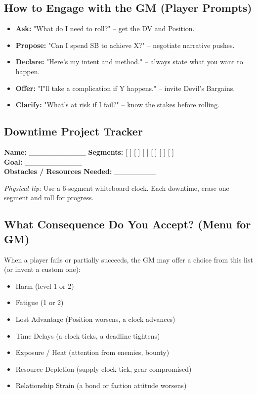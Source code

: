 \subsection{How to Engage with the GM (Player Prompts)}

\begin{itemize}
    \item \textbf{Ask:} "What do I need to roll?" -- get the DV and Position.
    \item \textbf{Propose:} "Can I spend SB to achieve X?" -- negotiate narrative pushes.
    \item \textbf{Declare:} "Here's my intent and method." -- always state what you want to happen.
    \item \textbf{Offer:} "I"ll take a complication if Y happens." -- invite Devil's Bargains.
    \item \textbf{Clarify:} "What's at risk if I fail?" -- know the stakes before rolling.
\end{itemize}

\subsection{Downtime Project Tracker}

\begin{tcolorbox}[colback=white,colframe=black,left=1em,right=1em]
\textbf{Name:} \_\_\_\_\_\_\_\_\_\_\_  \qquad \textbf{Segments:} [ ] [ ] [ ] [ ] [ ] [ ] \\
\textbf{Goal:} \_\_\_\_\_\_\_\_\_\_\_ \\
\textbf{Obstacles / Resources Needed:} \_\_\_\_\_\_\_\_
\end{tcolorbox}

\emph{Physical tip:} Use a 6‑segment whiteboard clock. Each downtime, erase one segment and roll for progress.

\subsection{What Consequence Do You Accept? (Menu for GM)}
\label{app:consequence-menu}

When a player fails or partially succeeds, the GM may offer a choice from this list (or invent a custom one):
\begin{itemize}
    \item Harm (level 1 or 2)
    \item Fatigue (1 or 2)
    \item Lost Advantage (Position worsens, a clock advances)
    \item Time Delays (a clock ticks, a deadline tightens)
    \item Exposure / Heat (attention from enemies, bounty)
    \item Resource Depletion (supply clock tick, gear compromised)
    \item Relationship Strain (a bond or faction attitude worsens)
\end{itemize}

